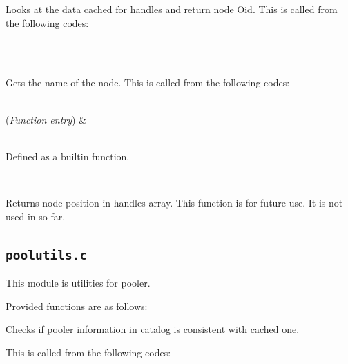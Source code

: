       Looks at the data cached for handles and return node Oid.
      This is called from the following codes:
      
      \FuncRefHdr
		  \\ \vspace{3pt}
		  \\ \hline
      \FuncRefTrailor
  
  
      Gets the name of the node.
      This is called from the following codes:
      
      \FuncRefHdr
		  \\ \vspace{3pt}
		  {(\textit{Function entry})} & {\raggedright {}\\{
				Defined as a builtin function.
		  		}}\\ \hline
      \FuncRefTrailor
  
  
	  Returns node position in handles array.
	  This function is for future use.   It is not used in \XC{} so far.
  
  


\subsection{\texttt{poolutils.c}}
  
  This module is utilities for \XC{} pooler.
  
  Provided functions are as follows:
  
  
      Checks if pooler information in catalog is consistent with cached one.
      
      This is called from the following codes:
      
